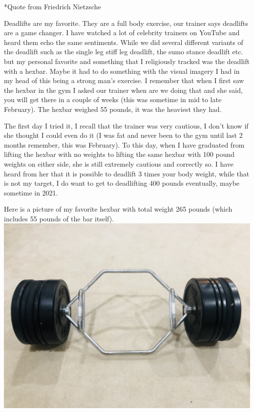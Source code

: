 \documentclass[
  oneside]{book}
\begin{document}
*Quote from Friedrich Nietzsche

Deadlifts are my favorite. They are a full body exercise, our trainer says deadlifts are a game changer. I have watched a lot of celebrity trainers on YouTube and heard them echo the same sentiments. While we did several different variants of the deadlift such as the single leg stiff leg deadlift, the sumo stance deadlift etc. but my personal favorite and something that I religiously tracked was the deadlift with a hexbar. Maybe it had to do something with the visual imagery I had in my head of this being a strong man's exercise. I remember that when I first saw the hexbar in the gym I asked our trainer when are we doing that and she said, you will get there in a couple of weeks (this was sometime in mid to late February). The hexbar weighed 55 pounds, it was the heaviest they had.

The first day I tried it, I recall that the trainer was very cautious, I don't know if she thought I could even do it (I was fat and never been to the gym until last 2 months remember, this was February). To this day, when I have graduated from lifting the hexbar with no weights to lifting the same hexbar with 100 pound weights on either side, she is still extremely cautious and correctly so. I have heard from her that it is possible to deadlift 3 times your body weight, while that is not my target, I do want to get to deadlifting 400 pounds eventually, maybe sometime in 2021.

Here is a picture of my favorite hexbar with total weight 265 pounds (which includes 55 pounds of the bar itself).\\
\includegraphics{pictures/hexbar-w-255p.jpg}
\end{document}
